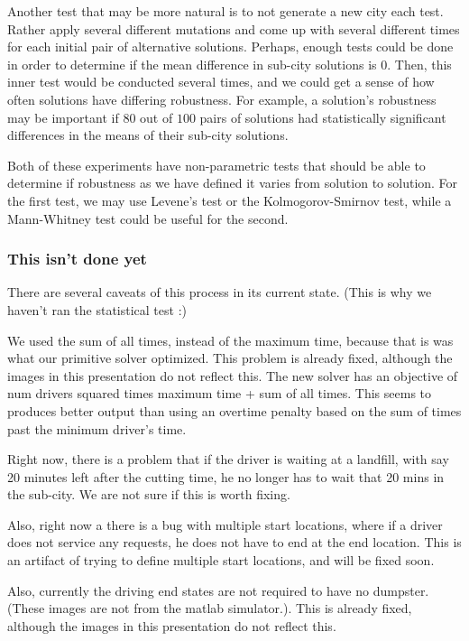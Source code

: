 \documentclass{article}
\begin{document}
Another test that may be more natural is to not generate a new city each test.
Rather apply several different mutations and come up with several different times for each initial pair of alternative solutions.
Perhaps, enough tests could be done in order to determine if the mean difference in sub-city solutions is $0$.
Then, this inner test would be conducted several times, and we could get a sense of how often solutions have differing robustness.
For example, a solution's robustness may be important if $80$ out of $100$ pairs of solutions had statistically significant differences in the means of their sub-city solutions.

Both of these experiments have non-parametric tests that should be able to determine if robustness as we have defined it varies from solution to solution.
For the first test, we may use Levene's test or the Kolmogorov-Smirnov test, while a Mann-Whitney test could be useful for the second.

\subsubsection{This isn't done yet}
There are several caveats of this process in its current state.
(This is why we haven't ran the statistical test :)

We used the sum of all times, instead of the maximum time, because that is was what our primitive solver optimized.
This problem is already fixed, although the images in this presentation do not reflect this.
The new solver has an objective of num drivers squared times maximum time + sum of all times.
This seems to produces better output than using an overtime penalty based on the sum of times past the minimum driver's time.

Right now, there is a problem that if the driver is waiting at a landfill, with say 20 minutes left after the cutting time, he no longer has to wait that 20 mins in the sub-city.
We are not sure if this is worth fixing.

Also, right now a there is a bug with multiple start locations, where if a driver does not service any requests, he does not have to end at the end location.
This is an artifact of trying to define multiple start locations, and will be fixed soon.

Also, currently the driving end states are not required to have no dumpster.
(These images are not from the matlab simulator.).
This is already fixed, although the images in this presentation do not reflect this.
\end{document}
